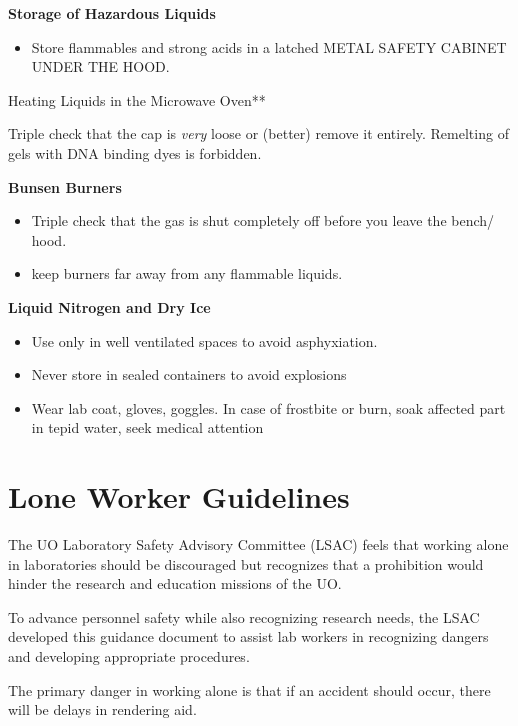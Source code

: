 \documentclass[
]{book}
\providecommand{\tightlist}{%
  \setlength{\itemsep}{0pt}\setlength{\parskip}{0pt}}
\begin{document}
\textbf{Storage of Hazardous Liquids}

\begin{itemize}
\tightlist
\item
  Store flammables and strong acids in a latched METAL SAFETY CABINET UNDER THE HOOD.
\end{itemize}

Heating Liquids in the Microwave Oven**

Triple check that the cap is \emph{very} loose or (better) remove it entirely. Remelting of gels with DNA binding dyes is forbidden.

\textbf{Bunsen Burners}

\begin{itemize}
\item
  Triple check that the gas is shut completely off before you leave the bench/ hood.
\item
  keep burners far away from any flammable liquids.
\end{itemize}

\textbf{Liquid Nitrogen and Dry Ice}

\begin{itemize}
\item
  Use only in well ventilated spaces to avoid asphyxiation.
\item
  Never store in sealed containers to avoid explosions
\item
  Wear lab coat, gloves, goggles. In case of frostbite or burn, soak affected part in tepid water, seek medical attention
\end{itemize}

\hypertarget{lone-worker-guidelines}{%
\section{Lone Worker Guidelines}\label{lone-worker-guidelines}}

The UO Laboratory Safety Advisory Committee (LSAC) feels that working alone in laboratories should be discouraged but recognizes that a prohibition would hinder the research and education missions of the UO.

To advance personnel safety while also recognizing research needs, the LSAC developed this guidance document to assist lab workers in recognizing dangers and developing appropriate procedures.

The primary danger in working alone is that if an accident should occur, there will be delays in rendering aid.
\end{document}
